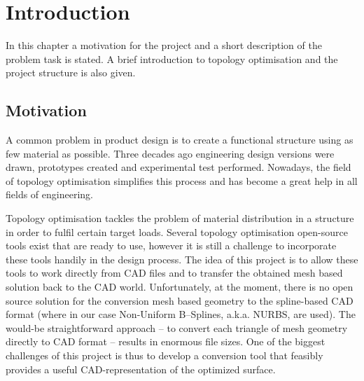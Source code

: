 \chapter{Introduction}
\label{chapter:Introduction}

In this chapter a motivation for the project and a short description of the problem task is stated. A brief introduction to topology optimisation and the project structure is also given.
\section{Motivation}
A common problem in product design is to create a functional structure using as few material as possible. Three decades ago engineering design versions were drawn, prototypes created and experimental test performed. Nowadays, the field of topology optimisation simplifies this process and has become a great help in all fields of engineering. 

Topology optimisation tackles the problem of material distribution in a structure in order to fulfil certain target loads. Several topology optimisation open-source tools exist that are ready to use, however it is still a challenge to incorporate these tools handily in the design process. The idea of this project is to allow these tools to work directly from CAD files and to transfer the obtained mesh based solution back to the CAD world. Unfortunately, at the moment, there is no open source solution for the conversion mesh based geometry to the spline-based CAD format (where in our case Non-Uniform B--Splines, a.k.a. NURBS, are used). The would-be straightforward approach -- to convert each triangle of mesh geometry directly to CAD format -- results in enormous file sizes. One of the biggest challenges of this project is thus to develop a conversion tool that feasibly provides a useful CAD-representation of the optimized surface.


%
%


